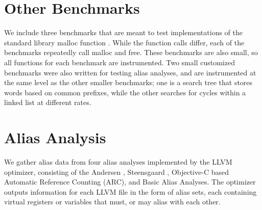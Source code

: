 \section{Other Benchmarks}
We include three benchmarks that are meant to test implementations of the standard library malloc function \cite{malloc}. While the function calls differ, each of the benchmarks repeatedly call malloc and free. These benchmarks are also small, so all functions for each benchmark are instrumented. Two small customized benchmarks were also written for testing alias analyses, and are instrumented at the same level as the other smaller benchmarks; one is a search tree that stores words based on common prefixes, while the other searches for cycles within a linked list at different rates. 

\section{Alias Analysis}
We gather alias data from four alias analyses implemented by the LLVM optimizer, consisting of the Andersen \cite{Andersen}, Steensgaard \cite{Steensgaard}, Objective-C based Automatic Reference Counting (ARC), and Basic \cite{llvmaa} Alias Analyses. The optimizer outputs information for each LLVM file in the form of alias sets, each containing virtual registers or variables that must, or may alias with each other.
